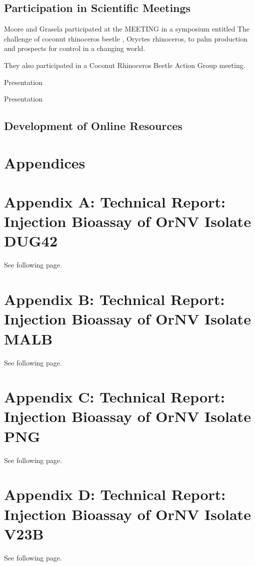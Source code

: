 \documentclass[12pt,letterpaper,english]{scrartcl}
\begin{document}
\subsection{Participation in Scientific Meetings}

Moore and Grasela participated at the MEETING in a symposium entitled The challenge of coconut rhinoceros beetle , Oryctes rhinoceros, to palm production and prospects for control in a changing world.

They also participated in a Coconut Rhinoceros Beetle Action Group meeting.

Presentation \cite{moore_status_2019}

Presentation \cite{marshall_challenge_2019}

\subsection{Development of Online Resources}

\newpage{}


\newpage

\section{Appendices}

\appendix

\section{\label{sec:Appendix-A}Appendix A: Technical Report: Injection Bioassay
of OrNV Isolate DUG42}

See following page.

%

\section{\label{sec:Appendix-B}Appendix B: Technical Report: Injection Bioassay
of OrNV Isolate MALB}

See following page.

%

\section{\label{sec:Appendix-C}Appendix C: Technical Report: Injection Bioassay
of OrNV Isolate PNG}

See following page.

%


\section{\label{sec:Appendix-D}Appendix D: Technical Report: Injection Bioassay
of OrNV Isolate V23B}

See following page.

%

\printbibliography[heading=bibintoc]
\end{document}
